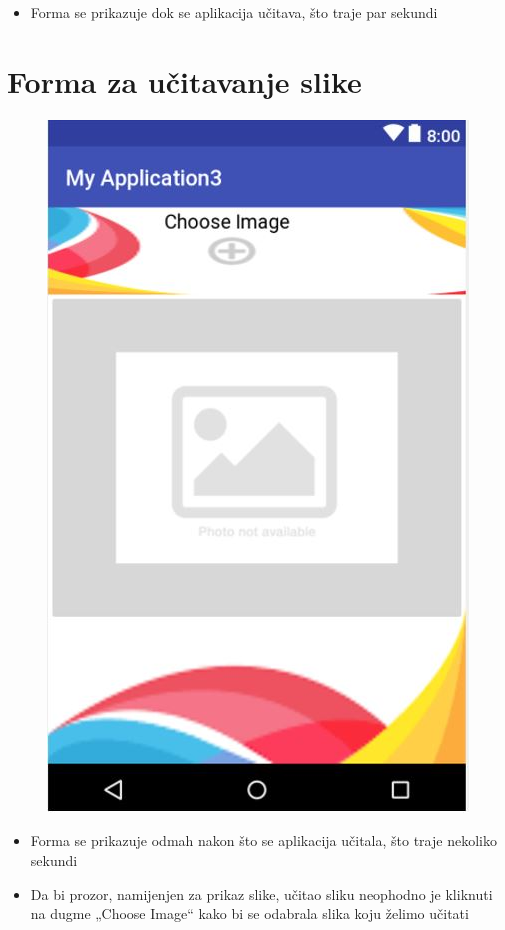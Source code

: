 \documentclass[12pt]{scrreprt}
\begin{document}
\begin{itemize}
	\item Forma se prikazuje dok se aplikacija učitava, što traje par sekundi
\end{itemize}

\chapter{Forma za učitavanje slike}

\begin{figure}[h]
	\begin{Center}
		\includegraphics{image3}
	\end{Center}
\end{figure}

\begin{itemize}
	\item Forma se prikazuje odmah nakon što se aplikacija učitala, što traje nekoliko sekundi
	\item Da bi prozor, namijenjen za prikaz slike, učitao sliku neophodno je kliknuti na dugme „Choose Image“ kako bi se odabrala slika koju želimo učitati
\end{itemize}
\end{document}
